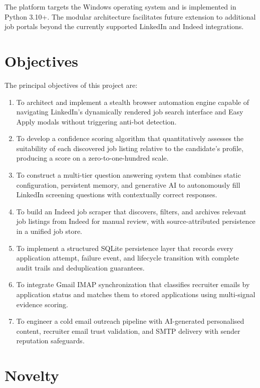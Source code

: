 \documentclass[12pt, a4paper, oneside]{report}
\begin{document}
The platform targets the Windows operating system and is implemented in Python 3.10+. The modular architecture facilitates future extension to additional job portals beyond the currently supported LinkedIn and Indeed integrations.

\section{Objectives}
\label{sec:objectives}

The principal objectives of this project are:

\begin{enumerate}
    \item To architect and implement a stealth browser automation engine capable of navigating LinkedIn's dynamically rendered job search interface and Easy Apply modals without triggering anti-bot detection.
    \item To develop a confidence scoring algorithm that quantitatively assesses the suitability of each discovered job listing relative to the candidate's profile, producing a score on a zero-to-one-hundred scale.
    \item To construct a multi-tier question answering system that combines static configuration, persistent memory, and generative AI to autonomously fill LinkedIn screening questions with contextually correct responses.
    \item To build an Indeed job scraper that discovers, filters, and archives relevant job listings from Indeed for manual review, with source-attributed persistence in a unified job store.
    \item To implement a structured SQLite persistence layer that records every application attempt, failure event, and lifecycle transition with complete audit trails and deduplication guarantees.
    \item To integrate Gmail IMAP synchronization that classifies recruiter emails by application status and matches them to stored applications using multi-signal evidence scoring.
    \item To engineer a cold email outreach pipeline with AI-generated personalised content, recruiter email trust validation, and SMTP delivery with sender reputation safeguards.
\end{enumerate}

\section{Novelty}
\label{sec:novelty}
\end{document}
